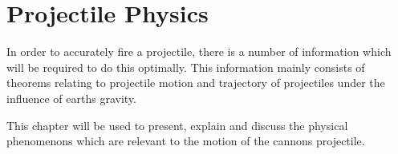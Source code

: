 \chapter{Projectile Physics}\label{ProjPhys}
In order to accurately fire a projectile, there is a number of information which
will be required to do this optimally. This information mainly consists of
theorems relating to projectile motion and trajectory of projectiles under the
influence of earths gravity.\nl

This chapter will be used to present, explain and discuss the physical
phenomenons which are relevant to the motion of the cannons projectile.



